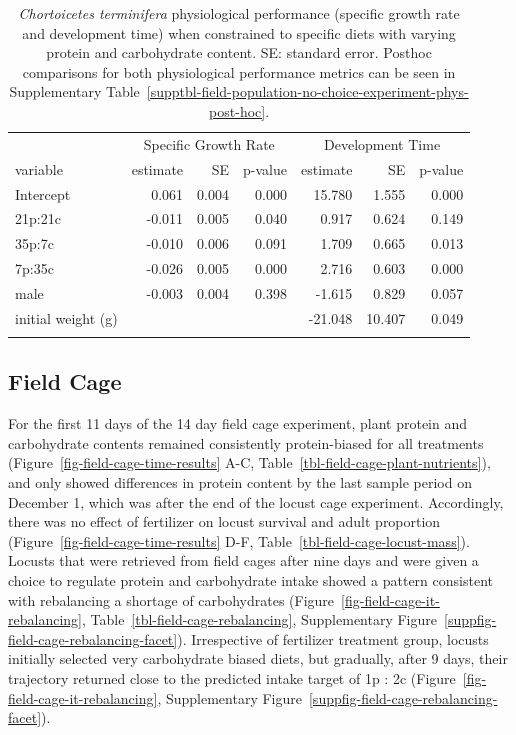 \documentclass[
]{article}
\begin{document}
\begingroup
\fontsize{12.0pt}{14.4pt}\selectfont

\begin{longtable}{lrrrrrr}

\toprule
 & \multicolumn{3}{c}{Specific Growth Rate} & \multicolumn{3}{c}{Development Time} \\ 
\cmidrule(lr){2-4} \cmidrule(lr){5-7}
variable & estimate & SE & p-value & estimate & SE & p-value \\ 
\midrule\addlinespace[2.5pt]
Intercept & 0.061 & 0.004 & 0.000 & 15.780 & 1.555 & 0.000 \\ 
21p:21c & -0.011 & 0.005 & 0.040 & 0.917 & 0.624 & 0.149 \\ 
35p:7c & -0.010 & 0.006 & 0.091 & 1.709 & 0.665 & 0.013 \\ 
7p:35c & -0.026 & 0.005 & 0.000 & 2.716 & 0.603 & 0.000 \\ 
male & -0.003 & 0.004 & 0.398 & -1.615 & 0.829 & 0.057 \\ 
initial weight (g) &  &  &  & -21.048 & 10.407 & 0.049 \\ 
\bottomrule

\caption{\label{tbl-field-population-no-choice-model}\emph{Chortoicetes
terminifera} physiological performance (specific growth rate and
development time) when constrained to specific diets with varying
protein and carbohydrate content. SE: standard error. Posthoc
comparisons for both physiological performance metrics can be seen in
Supplementary Table~\ref{supptbl-field-population-no-choice-experiment-phys-post-hoc}.}

\tabularnewline

\end{longtable}

\endgroup

\subsection{Field Cage}\label{field-cage}

For the first 11 days of the 14 day field cage experiment, plant protein
and carbohydrate contents remained consistently protein-biased for all
treatments (Figure~\ref{fig-field-cage-time-results} A-C,
Table~\ref{tbl-field-cage-plant-nutrients}), and only showed differences
in protein content by the last sample period on December 1, which was
after the end of the locust cage experiment. Accordingly, there was no
effect of fertilizer on locust survival and adult proportion
(Figure~\ref{fig-field-cage-time-results} D-F,
Table~\ref{tbl-field-cage-locust-mass}). Locusts that were retrieved
from field cages after nine days and were given a choice to regulate
protein and carbohydrate intake showed a pattern consistent with
rebalancing a shortage of carbohydrates
(Figure~\ref{fig-field-cage-it-rebalancing},
Table~\ref{tbl-field-cage-rebalancing},
Supplementary Figure~\ref{suppfig-field-cage-rebalancing-facet}).
Irrespective of fertilizer treatment group, locusts initially selected
very carbohydrate biased diets, but gradually, after 9 days, their
trajectory returned close to the predicted intake target of 1p : 2c
(Figure~\ref{fig-field-cage-it-rebalancing},
Supplementary Figure~\ref{suppfig-field-cage-rebalancing-facet}).
\end{document}
